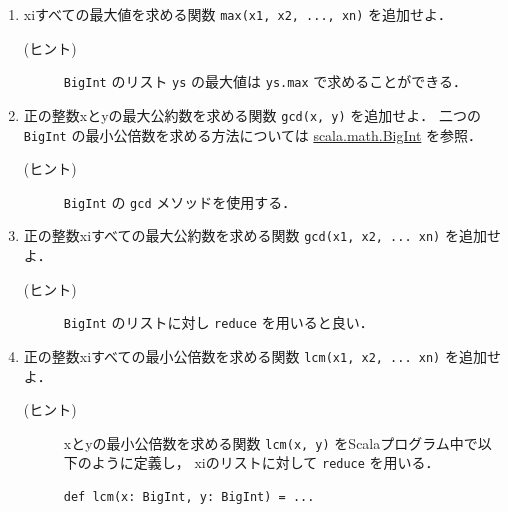\documentclass[a4j]{jsarticle}
\begin{document}
\begin{enumerate}
\item xiすべての最大値を求める関数 \texttt{max(x1, x2, ..., xn)} を追加せよ．
\begin{description}
\item[(ヒント)] \texttt{BigInt} のリスト \texttt{ys} の最大値は \texttt{ys.max} で求めることができる．
\end{description}
\item 正の整数xとyの最大公約数を求める関数 \texttt{gcd(x, y)} を追加せよ．
   二つの \texttt{BigInt} の最小公倍数を求める方法については \href{http://www.scala-lang.org/api/current/scala/math/BigInt.html}{scala.math.BigInt} を参照．
\begin{description}
\item[(ヒント)] \texttt{BigInt} の \texttt{gcd} メソッドを使用する．
\end{description}
\item 正の整数xiすべての最大公約数を求める関数 \texttt{gcd(x1, x2, ... xn)} を追加せよ．
\begin{description}
\item[(ヒント)] \texttt{BigInt} のリストに対し \texttt{reduce} を用いると良い．
\end{description}
\item 正の整数xiすべての最小公倍数を求める関数 \texttt{lcm(x1, x2, ... xn)} を追加せよ．
\begin{description}
\item[(ヒント)] xとyの最小公倍数を求める関数 \texttt{lcm(x, y)} をScalaプログラム中で以下のように定義し，
     xiのリストに対して \texttt{reduce} を用いる．

\begin{verbatim}
def lcm(x: BigInt, y: BigInt) = ...
\end{verbatim}
\end{description}
\end{enumerate}
\end{document}
